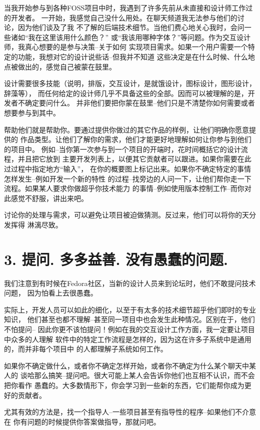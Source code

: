 当我开始参与到各种FOSS项目中时，我遇到了许多先前从未直接和设计师工作过的开发者。
一开始，我感觉自己没什么用处。在聊天频道我无法参与他们的讨论，因为他们谈及了我
不了解的后端技术细节。当他们费心地关心我时，会问一些诸如“我在这里该用什么颜色？”
或“我该用哪种字体？”等问题。作为交互设计师，我真心想要的是参与决策--关于如何
实现项目需求。如果一个用户需要一个特定的功能，我想对它的设计说些话--但我并不知道
这些决定是在什么时候、什么地点被做出的，感觉自己被蒙在鼓里。

设计需要很多技能（说明，排版，交互设计，是就饿设计，图标设计，图形设计，辞藻等），
而任何给定的设计师几乎不具备这些的全部。因而可以被理解的是，开发者不确定要问什么。
并非他们要把你蒙在鼓里--他们只是不清楚你如何需要或者想要参与到其中。

帮助他们就是帮助你。要通过提供你做过的其它作品的样例，让他们明确你愿意提供的
作品类型。让他们了解你的需求，他们才能更好地理解如何让你参与到他们的项目中。
例如--当你第一次参与到一个项目的开端时，花时间概括它的设计流程，并且把它放到
主要开发列表上，以便其它贡献者可以跟进。如果你需要在此过过程中指定地方“输入”，
在你的概要图上标记出来。如果你不确定特定的事情怎样发生--例如开发一个新的特性
的过程--找旁边的人问一下，让他们帮你走一下流程。如果某人要求你做超乎你技术能力
的事情--例如使用版本控制工作--而你对此感觉不舒服，讲出来吧。

讨论你的处理与需求，可以避免让项目被迫做猜测。反过来，他们可以将你的天分发挥得
淋漓尽致。

\section*{3. 提问. 多多益善. 没有愚蠢的问题.}
我们注意到有时候在Fedora社区，当新的设计人员来到论坛时，他们不敢提问技术问题，
因为怕看上去很愚蠢。

实际上，开发人员可以如此的细化，以至于有太多的技术细节超乎他们即时的专业知识，
他们甚至也都不理解--甚至同一项目中也会发生此种情况。区别在于，他们不怕提问--
因此你更不该怕提问！例如在我的交互设计工作方面，我一定要让项目中众多的人理解
软件中的特定工作流程是怎样的，因为这在许多子系统中是通用的，而并非每个项目中
的人都理解子系统如何工作。

如果你不确定做什么，或者你不确定怎样开始，或者你不确定为什么某个聊天中某人的
谈哈那么搞笑--提问吧。很大可能上某人会告诉你他们也互相不认识，而不会把你看作
愚蠢的。大多数情形下，你会学习到一些新的东西，它们能帮你成为更好的贡献者。

尤其有效的方法是，找一个指导人--一些项目甚至有指导性的程序--如果他们不介意在
你有问题的时候提供你答案做指导，那就问吧。

